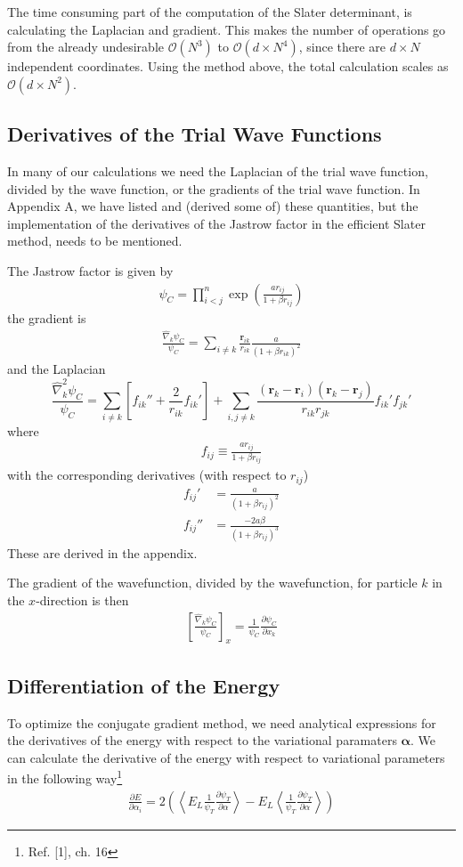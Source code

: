 \documentclass[twocolumns, a4paper,11pt,fleqn]{extarticle}
\newcommand{\eq}[1]{{\small\begin{align*}#1\end{align*}}}
\newcommand{\equ}[1]{{\small\begin{align}#1\end{align}}}
\renewcommand\vec[1]{\boldsymbol{\mathbf{#1}}}
\newcommand{\op}[1]{\hat{#1}}
\begin{document}
The time consuming part of the computation of the Slater determinant,
is calculating the Laplacian and gradient. This makes the
number of operations go from the already undesirable $\mathcal O(N^3)$ to
$\mathcal O(d\times N^4)$, since there are $d\times N$ independent coordinates.
Using the method above, the total calculation scales as
$\mathcal O(d\times N^2)$.


\subsection{Derivatives of the Trial Wave Functions}
In many of our calculations we need the Laplacian of the trial wave function,
divided by the wave function, or the gradients of the trial wave function.
In Appendix A, we have listed and (derived some of) these quantities,
but the implementation of the derivatives of
the Jastrow factor in the efficient Slater method, needs to be mentioned.

The Jastrow factor is given by
\equ{
  \psi_C = \prod_{i<j}^{n}\exp{\left(\frac{a r_{ij}}{1+\beta r_{ij}}\right)}
  \label{eq:psicor}
}
the gradient is
\eq{
  \frac{\op\nabla_k\psi_C}{\psi_C} =\sum_{i\neq k}\frac{\vec r_{ik}}{r_{ik}}\frac{a}{(1+\beta r_{ik})^2} 
}
and the Laplacian
{\tiny\begin{equation*}
  \frac{\op\nabla_k^2 \psi_C}{\psi_C}
    =\sum_{i\neq k}
    \left[f_{ik}''+ \frac{2}{r_{ik}}f_{ik}'\right]
    +
    \sum_{i,j\neq k}\frac{(\vec r_k-\vec r_i)(\vec r_k-\vec r_j)}{r_{ik} r_{jk}} 
    f_{ik}' f_{jk}'
\end{equation*}}%
where
\eq{
  f_{ij} \equiv \frac{ar_{ij}}{1+\beta r_{ij}}
}
with the corresponding derivatives (with respect to $r_{ij}$)
\eq{
  f_{ij}' &= \frac{a}{(1+\beta r_{ij})^2}\\
  f_{ij}'' &= \frac{-2a\beta}{(1+\beta r_{ij})^3}
}
These are derived in the appendix.

The gradient of the wavefunction, 
divided by the wavefunction, for particle $k$ in the $x$-direction is then
\eq{
  \left[\frac{\op\nabla_k\psi_C}{\psi_C}\right]_x 
  =\frac{1}{\psi_C}\frac{\partial\psi_C}{\partial x_k}
}

\subsection{Differentiation of the Energy}

To optimize the conjugate gradient method, we need analytical expressions
for the derivatives of the energy with respect to the variational paramaters
$\vec \alpha$.
We can calculate the derivative of the energy with respect
to variational parameters in the following way\footnote{Ref. [1], ch. 16}
\equ{
  \frac{\partial E}{\partial \alpha_i} =
  2 \left(
  \left\langle  
  E_L\frac{1}{\psi_T}\frac{\partial \psi_T}{\partial \alpha}
  \right\rangle
  - E_L \left\langle  
  \frac{1}{\psi_T}\frac{\partial \psi_T}{\partial \alpha}
  \right\rangle
  \right)\label{eq:Eder}
}
\end{document}
